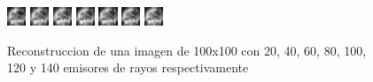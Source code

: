 \begin{figure}[H]
    \centering	\includegraphics[width=0.05\textwidth]{img/tomo_emisores_20.png}
\includegraphics[width=0.05\textwidth]{img/tomo_emisores_40.png}
\includegraphics[width=0.05\textwidth]{img/tomo_emisores_60.png}
\includegraphics[width=0.05\textwidth]{img/tomo_emisores_80.png}
\includegraphics[width=0.05\textwidth]{img/tomo_emisores_100.png}
\includegraphics[width=0.05\textwidth]{img/tomo_emisores_120.png}
\includegraphics[width=0.05\textwidth]{img/tomo_emisores_140.png}
	\caption{Reconstruccion de una imagen de 100x100 con 20, 40, 60, 80, 100, 120 y 140 emisores de rayos respectivamente}
	\label{fig:emisores}
\end{figure}


